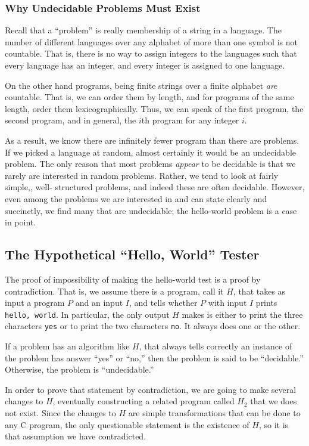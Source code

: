 \documentclass[]{article}
\begin{document}
\subsubsection*{Why Undecidable Problems Must Exist}
Recall that a ``problem'' is really membership of a string in a
language. The number of different languages over any alphabet of more
than one symbol is not countable. That is, there is no way to assign
integers to the languages such that every language has an integer, and
every integer is assigned to one language.

On the other hand programs, being finite strings over a finite alphabet
\emph{are} countable. That is, we can order them by length, and for
programs of the same length, order them lexicographically. Thus, we can
speak of the first program, the second program, and in general, the
$i$th program for any integer $i$.

As a result, we know there are infinitely fewer program than there are
problems. If we picked a language at random, almost certainly it would
be an undecidable problem. The only reason that most problems
\emph{appear} to be decidable is that we rarely are interested in
random problems. Rather, we tend to look at fairly simple,, well-
structured problems, and indeed these are often decidable. However,
even among the problems we are interested in and can state clearly and
succinctly, we find many that are undecidable; the hello-world problem
is a case in point.

\subsection*{The Hypothetical ``Hello, World'' Tester}
The proof of impossibility of making the hello-world test is a proof by
contradiction. That is, we assume there is a program, call it $H$, that
takes as input a program $P$ and an input $I$, and tells whether $P$ with
input $I$ prints \texttt{hello, world}. In particular, the only output $H$
makes is either to print the three characters \texttt{yes} or to print the
two characters \texttt{no}. It always does one or the other.

If a problem has an algorithm like $H$, that always tells correctly an
instance of the problem has answer ``yes'' or ``no,'' then the problem is
said to be ``decidable.'' Otherwise, the problem is ``undecidable.''

In order to prove that statement by contradiction, we are going to make
several changes to $H$, eventually constructing a related program called
$H_2$ that we does not exist. Since the changes to $H$ are simple
transformations that can be done to any C program, the only questionable
statement is the existence of $H$, so it is that assumption we have
contradicted.
\end{document}
